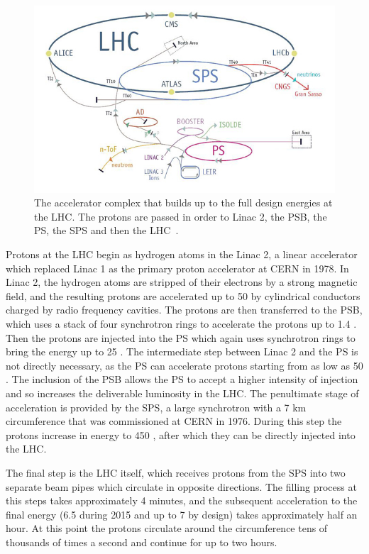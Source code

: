 \begin{figure}[h]
\centering
\includegraphics[width=\fullfig]{figures/accelerator_complex.jpg}
\caption{The accelerator complex that builds up to the full design energies at the \acs*{LHC}. The protons are passed in order to Linac 2, the \acs*{PSB}, the \acs*{PS}, the \acs*{SPS} and then the \acs*{LHC}~\cite{complex_graphic}.}
\label{fig:accelerator_complex}
\end{figure}

Protons at the \ac{LHC} begin as hydrogen atoms in the Linac 2, a linear accelerator which replaced Linac 1 as the primary proton accelerator at CERN in 1978.
In Linac 2, the hydrogen atoms are stripped of their electrons by a strong magnetic field, and the resulting protons are accelerated up to 50 \MeV by cylindrical conductors charged by radio frequency cavities.
The protons are then transferred to the \ac{PSB}, which uses a stack of four synchrotron rings to accelerate the protons up to 1.4 \GeV.
Then the protons are injected into the \ac{PS} which again uses synchrotron rings to bring the energy up to 25 \GeV.
The intermediate step between Linac 2 and the \ac{PS} is not directly necessary, as the \ac{PS} can accelerate protons starting from as low as 50 \MeV.
The inclusion of the \ac{PSB} allows the \ac{PS} to accept a higher intensity of injection and so increases the deliverable luminosity in the \ac{LHC}.
The penultimate stage of acceleration is provided by the \ac{SPS}, a large synchrotron with a 7 km circumference that was commissioned at CERN in 1976.
During this step the protons increase in energy to 450 \GeV, after which they can be directly injected into the \ac{LHC}. 


The final step is the \ac{LHC} itself, which receives protons from the \ac{SPS} into two separate beam pipes which circulate in opposite directions.
The filling process at this steps takes approximately 4 minutes, and the subsequent acceleration to the final energy (6.5 \TeV during 2015 and up to 7 \TeV by design) takes approximately half an hour.
At this point the protons circulate around the circumference tens of thousands of times a second and continue for up to two hours.


